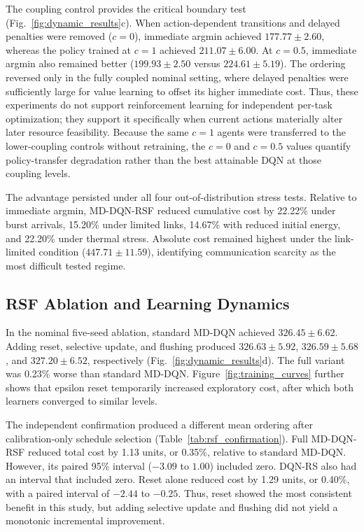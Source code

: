 \documentclass[lettersize,journal]{IEEEtran}
\begin{document}
The coupling control provides the critical boundary test (Fig.~\ref{fig:dynamic_results}c). When action-dependent transitions and delayed penalties were removed ($c=0$), immediate argmin achieved $177.77\pm2.60$, whereas the policy trained at $c=1$ achieved $211.07\pm6.00$. At $c=0.5$, immediate argmin also remained better ($199.93\pm2.50$ versus $224.61\pm5.19$). The ordering reversed only in the fully coupled nominal setting, where delayed penalties were sufficiently large for value learning to offset its higher immediate cost. Thus, these experiments do not support reinforcement learning for independent per-task optimization; they support it specifically when current actions materially alter later resource feasibility. Because the same $c=1$ agents were transferred to the lower-coupling controls without retraining, the $c=0$ and $c=0.5$ values quantify policy-transfer degradation rather than the best attainable DQN at those coupling levels.

The advantage persisted under all four out-of-distribution stress tests. Relative to immediate argmin, MD-DQN-RSF reduced cumulative cost by 22.22\% under burst arrivals, 15.20\% under limited links, 14.67\% with reduced initial energy, and 22.20\% under thermal stress. Absolute cost remained highest under the link-limited condition ($447.71\pm11.59$), identifying communication scarcity as the most difficult tested regime.

\subsection{RSF Ablation and Learning Dynamics}

In the nominal five-seed ablation, standard MD-DQN achieved $326.45\pm6.62$. Adding reset, selective update, and flushing produced $326.63\pm5.92$, $326.59\pm5.68$, and $327.20\pm6.52$, respectively (Fig.~\ref{fig:dynamic_results}d). The full variant was 0.23\% worse than standard MD-DQN. Figure~\ref{fig:training_curves} further shows that epsilon reset temporarily increased exploratory cost, after which both learners converged to similar levels.

The independent confirmation produced a different mean ordering after calibration-only schedule selection (Table~\ref{tab:rsf_confirmation}). Full MD-DQN-RSF reduced total cost by 1.13 units, or 0.35\%, relative to standard MD-DQN. However, its paired 95\% interval ($-3.09$ to $1.00$) included zero. DQN-RS also had an interval that included zero. Reset alone reduced cost by 1.29 units, or 0.40\%, with a paired interval of $-2.44$ to $-0.25$. Thus, reset showed the most consistent benefit in this study, but adding selective update and flushing did not yield a monotonic incremental improvement.
\end{document}
